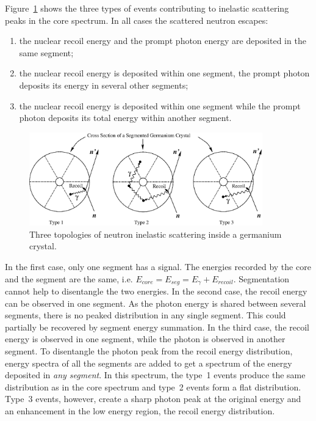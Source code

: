 Figure~\ref{fig:neu:inel} shows the three types of events contributing to inelastic scattering peaks in the core spectrum. In all cases the scattered neutron escapes:
\begin{enumerate}
\item the nuclear recoil energy and the prompt photon energy are deposited in the same segment;
\item the nuclear recoil energy is deposited within one segment, the prompt photon deposits its energy in several other segments;
\item the nuclear recoil energy is deposited within one segment while the prompt photon deposits its total energy within another segment.
\end{enumerate}

\begin{figure}[tbhp]
\centering
\includegraphics[width=0.9\textwidth]{ine_1}
\caption{Three topologies of neutron inelastic scattering inside a germanium crystal.}
\label{fig:neu:inel}
\end{figure}

In the first case, only one segment has a signal. The energies recorded by the core and the segment are the same, i.e. $E_{core} = E_{seg} = E_{\gamma} + E_{recoil}$. Segmentation cannot help to disentangle the two energies. In the second case, the recoil energy can be observed in one segment. As the photon energy is shared between several segments, there is no peaked distribution in any single segment. This could partially be recovered by segment energy
summation. In the third case, the recoil energy is observed in one segment, while the photon is observed in another segment. To disentangle the photon peak from the recoil energy distribution, energy spectra of all the segments are added to get a spectrum of the energy deposited in \emph{any segment}. In this spectrum, the type~1 events produce the same distribution as in the core spectrum and type~2 events form a flat distribution. Type~3 events, however, create a sharp photon peak at the original energy and an enhancement in the low energy region, the recoil energy distribution.

